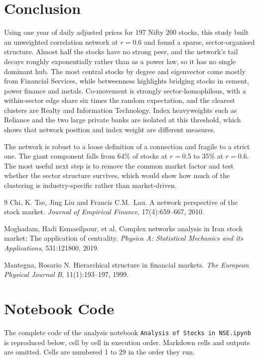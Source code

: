 \documentclass[12pt,a4paper]{report}
\begin{document}
\chapter{Conclusion}

Using one year of daily adjusted prices for 197 Nifty 200 stocks, this study built an unweighted correlation network at $r=0.6$ and found a sparse, sector-organised structure. Almost half the stocks have no strong peer, and the network's tail decays roughly exponentially rather than as a power law, so it has no single dominant hub. The most central stocks by degree and eigenvector come mostly from Financial Services, while betweenness highlights bridging stocks in cement, power finance and metals. Co-movement is strongly sector-homophilous, with a within-sector edge share six times the random expectation, and the clearest clusters are Realty and Information Technology. Index heavyweights such as Reliance and the two large private banks are isolated at this threshold, which shows that network position and index weight are different measures.

The network is robust to a loose definition of a connection and fragile to a strict one. The giant component falls from 64\% of stocks at $r=0.5$ to 35\% at $r=0.6$. The most useful next step is to remove the common market factor and test whether the sector structure survives, which would show how much of the clustering is industry-specific rather than market-driven.

\begin{thebibliography}{9}
Chi, K. Tse, Jing Liu and Francis C.M.\ Lau.
\newblock A network perspective of the stock market.
\newblock \emph{Journal of Empirical Finance}, 17(4):659--667, 2010.

Moghadam, Hadi Esmaeilpour, et al.
\newblock Complex networks analysis in Iran stock market: The application of centrality.
\newblock \emph{Physica A: Statistical Mechanics and its Applications}, 531:121800, 2019.

Mantegna, Rosario N.
\newblock Hierarchical structure in financial markets.
\newblock \emph{The European Physical Journal B}, 11(1):193--197, 1999.
\end{thebibliography}

\appendix
\chapter{Notebook Code}
The complete code of the analysis notebook \texttt{Analysis of Stocks in NSE.ipynb} is reproduced below, cell by cell in execution order. Markdown cells and outputs are omitted. Cells are numbered 1 to 29 in the order they run.
\end{document}
